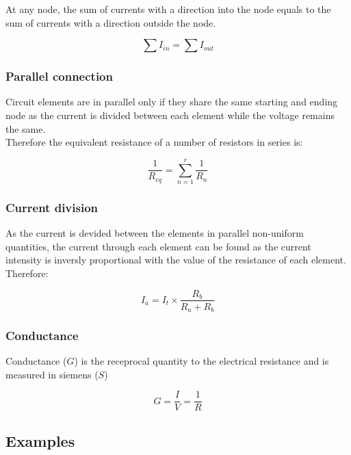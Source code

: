 \documentclass[a4paper]{book}
\begin{document}
\noindent At any node, the sum of currents with a direction into the node equals to the sum of
currents with a direction outside the node.

\[\sum I_{in} = \sum I_{out}\]

\subsubsection{Parallel connection}

Circuit elements are in parallel only if they share the same starting and ending node as the current is 
divided between each element while the voltage remains the same.\\
Therefore the equivalent resistance of a number of resistors in series is:

\[\frac{1}{R_{eq}} = \sum_{n=1}^r \frac{1}{R_n}\]

\subsubsection{Current division}

As the current is devided between the elements in parallel non-uniform quantities, the current through
each element can be found as the current intensity is inversly proportional with the value of the resistance of each element. Therefore:

\[I_a = I_{t} \times \frac{R_b}{R_a + R_b}\]

\subsubsection{Conductance}

Conductance ($G$) is the receprocal quantity to the electrical resistance and is measured in siemens ($S$)

\[G = \frac{I}{V} = \frac{1}{R}\]

\subsection{Examples}

\end{document}
